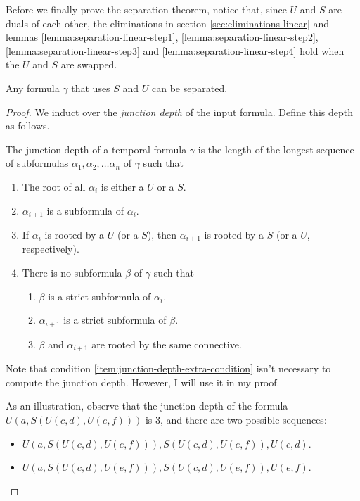 \documentclass[a4paper,UKenglish,cleveref, autoref, thm-restate]{lipics-v2021}
\begin{document}
Before we finally prove the separation theorem, notice that, since $U$ and $S$ are duals of each other, the eliminations in section \ref{sec:eliminations-linear} and lemmas \ref{lemma:separation-linear-step1}, \ref{lemma:separation-linear-step2}, \ref{lemma:separation-linear-step3} and \ref{lemma:separation-linear-step4} hold when the $U$ and $S$ are swapped.
\begin{theorem}
    \label{theorem:separation-linear-final}
    Any formula $\gamma$ that uses $S$ and $U$ can be separated.
\end{theorem}
\begin{proof}
    We induct over the \textit{junction depth} of the input formula. Define this depth as follows.
    \begin{definition}
        The junction depth of a temporal formula $\gamma$ is the length of the longest sequence of subformulas $\alpha_1, \alpha_2, \ldots \alpha_n$ of $\gamma$ such that
        \begin{enumerate}
            \item The root of all $\alpha_i$ is either a $U$ or a $S$.
            \item $\alpha_{i+1}$ is a subformula of $\alpha_i$.
            \item If $\alpha_i$ is rooted by a $U$ (or a $S$), then $\alpha_{i+1}$ is rooted by a $S$ (or a $U$, respectively).
            \item There is no subformula $\beta$ of $\gamma$ such that \label{item:junction-depth-extra-condition}
                \begin{enumerate}
                    \item $\beta$ is a strict subformula of $\alpha_i$.
                    \item $\alpha_{i+1}$ is a strict subformula of $\beta$.
                    \item $\beta$ and $\alpha_{i+1}$ are rooted by the same connective.
                \end{enumerate}
        \end{enumerate}
    \end{definition}
    Note that condition \ref{item:junction-depth-extra-condition} isn't necessary to compute the junction depth. However, I will use it in my proof.

    As an illustration, observe that the junction depth of the formula $U \left(a, S\left( U(c, d), U(e, f) \right) \right)$ is 3, and there are two possible sequences:
    \begin{itemize}
        \item $U \left(a, S\left( U(c, d), U(e, f) \right) \right), S(U(c, d), U(e, f)), U(c, d)$.
        \item $U \left(a, S\left( U(c, d), U(e, f) \right) \right), S(U(c, d), U(e, f)), U(e, f)$.
    \end{itemize}


\end{proof}
\end{document}
